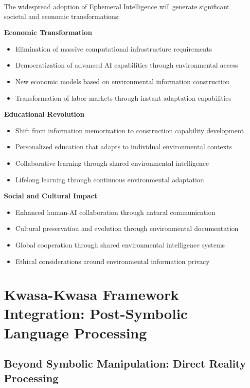\documentclass[12pt,a4paper]{article}
\begin{document}
The widespread adoption of Ephemeral Intelligence will generate significant societal and economic transformations:

\textbf{Economic Transformation}
\begin{itemize}
\item Elimination of massive computational infrastructure requirements
\item Democratization of advanced AI capabilities through environmental access
\item New economic models based on environmental information construction
\item Transformation of labor markets through instant adaptation capabilities
\end{itemize}

\textbf{Educational Revolution}
\begin{itemize}
\item Shift from information memorization to construction capability development
\item Personalized education that adapts to individual environmental contexts
\item Collaborative learning through shared environmental intelligence
\item Lifelong learning through continuous environmental adaptation
\end{itemize}

\textbf{Social and Cultural Impact}
\begin{itemize}
\item Enhanced human-AI collaboration through natural communication
\item Cultural preservation and evolution through environmental documentation
\item Global cooperation through shared environmental intelligence systems
\item Ethical considerations around environmental information privacy
\end{itemize}

\section{Kwasa-Kwasa Framework Integration: Post-Symbolic Language Processing}

\subsection{Beyond Symbolic Manipulation: Direct Reality Processing}
\end{document}
